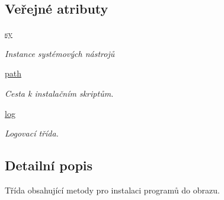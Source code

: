 \subsection*{Veřejné atributy}
\begin{DoxyCompactItemize}
\item 
\hypertarget{classinFocus_1_1inFocus_ae2b30d87560fa79d4676507a0edc476e}{\hyperlink{classinFocus_1_1inFocus_ae2b30d87560fa79d4676507a0edc476e}{sy}}\label{d3/d33/classinFocus_1_1inFocus_ae2b30d87560fa79d4676507a0edc476e}

\begin{DoxyCompactList}\small\item\em Instance systémových nástrojů \end{DoxyCompactList}\item 
\hypertarget{classinFocus_1_1inFocus_a49c854019791b3c216135e1ce7881aaa}{\hyperlink{classinFocus_1_1inFocus_a49c854019791b3c216135e1ce7881aaa}{path}}\label{d3/d33/classinFocus_1_1inFocus_a49c854019791b3c216135e1ce7881aaa}

\begin{DoxyCompactList}\small\item\em Cesta k instalačním skriptům. \end{DoxyCompactList}\item 
\hypertarget{classinFocus_1_1inFocus_a8f419c1bc959a1a56ff8fc522c7cf405}{\hyperlink{classinFocus_1_1inFocus_a8f419c1bc959a1a56ff8fc522c7cf405}{log}}\label{d3/d33/classinFocus_1_1inFocus_a8f419c1bc959a1a56ff8fc522c7cf405}

\begin{DoxyCompactList}\small\item\em Logovací třída. \end{DoxyCompactList}\end{DoxyCompactItemize}


\subsection{Detailní popis}
Třída obsahující metody pro instalaci programů do obrazu. 

